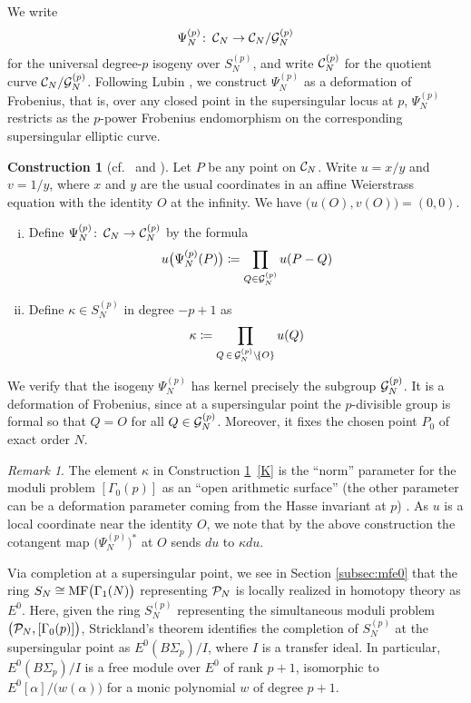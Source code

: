 \documentclass{gtpart}
\theoremstyle{definition}
\newtheorem{cstr}[thm]{Construction}
\theoremstyle{remark}
\newtheorem{rmk}[thm]{Remark}
\def\co{\colon\thinspace}
\newcommand{\CC}{{\cal C}}
\newcommand{\CG}{{\cal G}}
\newcommand{\CP}{{\cal P}}
\newcommand{\MF}{{\rm MF}}
\newcommand{\A}{\alpha}
\newcommand{\G}{\Gamma}
\newcommand{\K}{\kappa}
\newcommand{\ce}{\coloneqq}
\renewcommand{\=}{\approx}
\renewcommand{\-}{\sim}
\numberwithin{equation}{section}
\numberwithin{thm}{section}
\begin{document}
We write 
\[
 \Psi_N^{(p)} \co \CC_N \to \CC_N / \CG_N^{(p)} 
\]
for the universal degree-$p$ isogeny over $S_N^{(p)}$, and write $\CC_N^{(p)}$ for the quotient curve $\CC_N / \CG_N^{(p)}$.  
Following Lubin \cite[proof of Theorem 1.4]{Lubin67}, we construct $\Psi_N^{(p)}$ as a deformation of Frobenius, 
that is, over any closed point in the supersingular locus at $p$, $\Psi_N^{(p)}$ restricts as the $p$-power Frobenius endomorphism on the corresponding supersingular elliptic curve.  
\begin{cstr}[{cf.~\cite[proof of Theorem 1.4]{Lubin67} and \cite[Section 7.7]{KM}}]
 \label{cstr}
 Let $P$ be any point on $\CC_N$.  
 Write $u = x / y$ and $v = 1 / y$, 
 where $x$ and $y$ are the usual coordinates in an affine Weierstrass equation with the identity $O$ at the infinity.  
 We have $\big( u(O), v(O) \big) = (0,0)$.  
 \begin{enumerate}[(i)]
  \item  Define $\Psi_N^{(p)} \co \CC_N \to \CC_N^{(p)}$ by the formula 
  \[
   u\big(\Psi_N^{(p)}(P)\big) \ce \prod_{Q \in \CG_N^{(p)}} u(P - Q) 
  \]

  \item \label{K}  Define $\K \in S_N^{(p)}$ in degree $-p + 1$ as 
  \[
   \K \ce \prod_{Q \, \in \, \CG_N^{(p)} \setminus \! \{O\}} u(Q) 
  \]
 \end{enumerate}
\end{cstr}
We verify that the isogeny $\Psi_N^{(p)}$ has kernel precisely the subgroup $\CG_N^{(p)}$.  
It is a deformation of Frobenius, 
since at a supersingular point the $p$-divisible group is formal so that $Q = O$ for all $Q \in \CG_N^{(p)}$.  
Moreover, it fixes the chosen point $P_0$ of exact order $N$.  

\begin{rmk}
 \label{rmk:K}
 The element $\K$ in Construction \ref{cstr}~\!\eqref{K} is the ``norm'' parameter for the moduli problem $[\G_0(p)]$ as an ``open arithmetic surface'' 
 (the other parameter can be a deformation parameter coming from the Hasse invariant at $p$) \cite[Section 7.7]{KM}.  
 As $u$ is a local coordinate near the identity $O$, 
 we note that by the above construction the cotangent map $\big(\Psi_N^{(p)}\big)^*$ at $O$ sends $du$ to $\K du$.  
\end{rmk}

Via completion at a supersingular point, we see in Section \ref{subsec:mfe0} that the ring $S_N \cong \MF\big(\G_1(N)\big)$ representing $\CP_N$ is locally realized in homotopy theory as $E^0$.  
Here, given the ring $S_N^{(p)}$ representing the simultaneous moduli problem $\big(\CP_N,[\G_0(p)]\big)$, 
Strickland's theorem \cite[Theorem 1.1]{Str98} identifies the completion of $S_N^{(p)}$ at the supersingular point as $E^0(B\Sigma_p) / I$, where $I$ is a transfer ideal.  
In particular, $E^0(B\Sigma_p) / I$ is a free module over $E^0$ of rank $p + 1$, isomorphic to $E^0[\A] / \big( w(\A) \big)$ for a monic polynomial $w$ of degree $p + 1$.  
\end{document}

